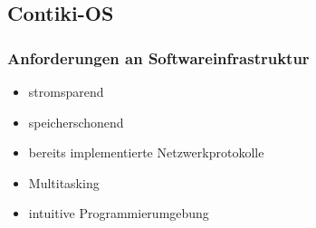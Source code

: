 \subsection{Contiki-OS}


\subsubsection{Anforderungen an Softwareinfrastruktur}
\begin{frame}{\insertsubsubsection}{}
	\begin{itemize}
	\item	stromsparend
	\item	speicherschonend
	\item	bereits implementierte Netzwerkprotokolle
	\item	Multitasking
	\item	intuitive Programmierumgebung
	\end{itemize}
\end{frame}


